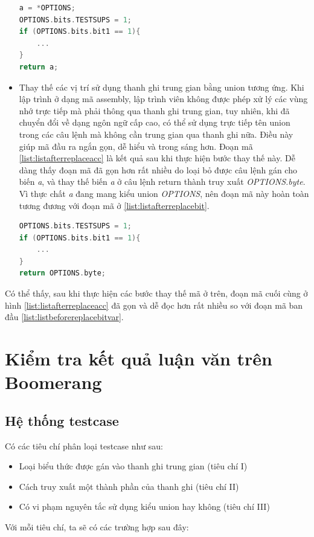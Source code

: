 \begin{itemize}
\begin{lstlisting}[caption={Mã đầu ra sau khi thực hiện bước thay thế truy xuất trực tiếp đến một phần của thanh ghi trung gian},label={list:listafterreplacebit}, language = c]
a = *OPTIONS;
OPTIONS.bits.TESTSUPS = 1;
if (OPTIONS.bits.bit1 == 1){
	...
}
return a;
\end{lstlisting}
\item Thay thế các vị trí sử dụng thanh ghi trung gian bằng union tương ứng. Khi lập trình ở dạng mã assembly, lập trình viên không được phép xử lý các vùng nhớ trực tiếp mà phải thông qua thanh ghi trung gian, tuy nhiên, khi đã chuyển đổi về dạng ngôn ngữ cấp cao, có thể sử dụng trực tiếp tên union trong các câu lệnh mà không cần trung gian qua thanh ghi nữa. Điều này giúp mã đầu ra ngắn gọn, dễ hiểu và trong sáng hơn. Đoạn mã \ref{list:listafterreplaceacc} là kết quả sau khi thực hiện bước thay thế này. Dễ dàng thấy đoạn mã đã gọn hơn rất nhiều do loại bỏ được câu lệnh gán cho biến \textit{a}, và thay thế biến \textit{a} ở câu lệnh return thành truy xuất \textit{OPTIONS.byte}. Vì thực chất \textit{a} đang mang kiểu union \textit{OPTIONS}, nên đoạn mã này hoàn toàn tương đương với đoạn mã ở \ref{list:listafterreplacebit}.

\begin{lstlisting}[caption={Mã đầu ra sau khi thực hiện bước thay thế thanh ghi trung gian},label={list:listafterreplaceacc}, language = c]
OPTIONS.bits.TESTSUPS = 1;
if (OPTIONS.bits.bit1 == 1){
	...
}
return OPTIONS.byte;
\end{lstlisting}
\end{itemize}

Có thể thấy, sau khi thực hiện các bước thay thế mã ở trên, đoạn mã cuối cùng ở hình \ref{list:listafterreplaceacc} đã gọn và dễ đọc hơn rất nhiều so với đoạn mã ban đầu \ref{list:listbeforereplacebitvar}.
\section{Kiểm tra kết quả luận văn trên Boomerang}

\subsection{Hệ thống testcase}
Có các tiêu chí phân loại testcase như sau:
\begin{itemize}
	\item Loại biểu thức được gán vào thanh ghi trung gian (tiêu chí I)
	\item Cách truy xuất một thành phần của thanh ghi (tiêu chí II)
	\item Có vi phạm nguyên tắc sử dụng kiểu union hay không (tiêu chí III)
\end{itemize}
Với mỗi tiêu chí, ta sẽ có các trường hợp sau đây:

